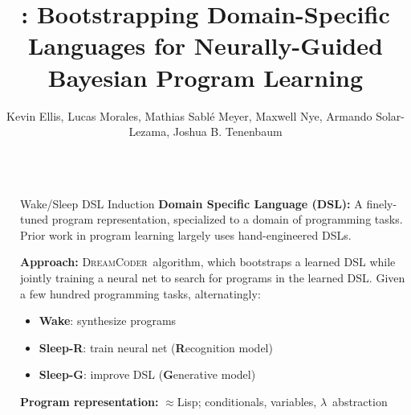 \documentclass[final]{beamer}
\title{\systemEnding: Bootstrapping Domain-Specific Languages for Neurally-Guided Bayesian Program Learning} %
\author{Kevin Ellis, Lucas Morales, Mathias Sabl\'e Meyer, Maxwell Nye, Armando Solar-Lezama, Joshua B. Tenenbaum} %
\institute{Massachusetts Institute of Technology} %
\newlength{\sepwid}
\newlength{\onecolwid}
\newcommand{\system}{\textsc{DreamCoder}~}
\begin{document}

\setlength{\belowcaptionskip}{2ex} %
\setlength\belowdisplayshortskip{2ex} %

\begin{frame}[t] %

\begin{columns}[t] %

\begin{column}{\sepwid}\end{column} %

\begin{column}{\onecolwid} %


\begin{alertblock}{Wake/Sleep DSL Induction}
  \textbf{Domain Specific Language (DSL):}
  A finely-tuned program representation, specialized to a domain of programming tasks.
  Prior work in program learning  largely uses hand-engineered DSLs.

  \textbf{Approach:}  \system algorithm,
  which bootstraps a learned DSL while jointly training
  a neural net to search for programs in the learned DSL.
Given a few hundred programming tasks, alternatingly:
  \begin{itemize}
  \item \textbf{Wake}: synthesize programs
  \item \textbf{Sleep-R}: train neural net (\textbf{R}ecognition model)
    \item \textbf{Sleep-G}: improve DSL (\textbf{G}enerative model)
    \end{itemize}

  \textbf{Program representation:}
  $\approx $Lisp; conditionals, variables, $\lambda$~abstraction

\end{alertblock}


\end{column}
\end{columns}
\end{frame}
\end{document}
